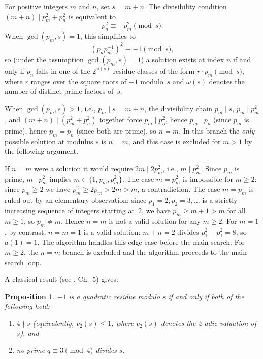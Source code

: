 \documentclass[12pt]{article}
\newtheorem{proposition}{Proposition}
\begin{document}
	For positive integers $m$ and $n$, set $s = m + n$.
	The divisibility condition $(m+n) \mid p_m^2 + p_n^2$ is equivalent to
	\[
	p_n^2 \equiv -p_m^2 \pmod{s}.
	\]
	When $\gcd(p_m, s) = 1$, this simplifies to
	\[
	\left( p_n p_m^{-1} \right)^2 \equiv -1 \pmod{s},
	\]
	so (under the assumption $\gcd(p_m, s) = 1$) a solution exists at
	index $n$ if and only if $p_n$ falls in one of
	the $2^{\omega(s)}$ residue classes of the form $r \cdot p_m \pmod{s}$,
	where $r$ ranges over the square roots of $-1$ modulo~$s$
	and $\omega(s)$ denotes the number of distinct prime factors of~$s$.
	
	When $\gcd(p_m, s) > 1$, i.e., $p_m \mid s = m+n$, the divisibility
	chain $p_m \mid s$, $p_m \mid p_m^2$, and $(m+n) \mid (p_m^2 + p_n^2)$
	together force $p_m \mid p_n^2$, hence $p_m \mid p_n$ (since $p_m$ is
	prime), hence $p_m = p_n$ (since both are prime), so $n = m$.
	In this branch the \emph{only} possible solution at modulus $s$ is
	$n = m$, and this case is excluded for $m > 1$ by the following
	argument.
	
	If $n = m$ were a solution it would require $2m \mid 2p_m^2$,
	i.e., $m \mid p_m^2$.
	Since $p_m$ is prime, $m \mid p_m^2$ implies $m \in \{1, p_m, p_m^2\}$.
	The case $m = p_m^2$ is impossible for $m \geq 2$: since $p_m \geq 2$
	we have $p_m^2 \geq 2p_m > 2m > m$, a contradiction.
	The case $m = p_m$ is ruled out by an elementary observation: since
	$p_1 = 2, p_2 = 3, \ldots$ is a strictly increasing sequence of
	integers starting at~$2$, we have $p_m \geq m + 1 > m$ for all
	$m \geq 1$, so $p_m \neq m$.
	Hence $n = m$ is not a valid solution for any $m \geq 2$.
	For $m = 1$, by contrast, $n = m = 1$ is a valid solution: $m + n = 2$
	divides $p_1^2 + p_1^2 = 8$, so $a(1) = 1$.
	The algorithm handles this edge case before the main search.
	For $m \geq 2$, the $n = m$ branch is excluded and the algorithm
	proceeds to the main search loop.
	
	A classical result (see \cite{IrelandRosen}, Ch.~5) gives:
	
	\begin{proposition}\label{prop:qr}
		$-1$ is a quadratic residue modulo $s$ if and only if both of the
		following hold:
		\begin{enumerate}
			\item[(a)] $4 \nmid s$ \textup{(}equivalently, $v_2(s) \leq 1$,
			where $v_2(s)$ denotes the 2-adic valuation of $s$\textup{)}, and
			\item[(b)] no prime $q \equiv 3 \pmod{4}$ divides $s$.
		\end{enumerate}
	\end{proposition}
	
\end{document}

